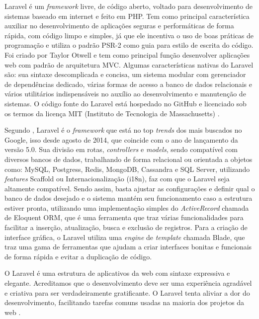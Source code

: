 Laravel é um \textit{framework} livre, de código aberto, voltado para desenvolvimento de sistemas baseado em internet e feito em PHP. Tem como principal característica auxiliar no desenvolvimento de aplicações seguras e performáticas de forma rápida, com código limpo e simples, já que ele incentiva o uso de boas práticas de programação e utiliza o padrão PSR-2 como guia para estilo de escrita do código. Foi criado por Taylor Otwell e tem como principal função desenvolver aplicações web com padrão de arquitetura MVC. Algumas características nativas do Laravel são: sua sintaxe descomplicada e concisa, um sistema modular com gerenciador de dependências dedicado, várias formas de acesso a banco de dados relacionais e vários utilitários indispensáveis no auxílio ao desenvolvimento e manutenção de sistemas. O código fonte do Laravel está hospedado no GitHub e licenciado sob os termos da licença MIT (Instituto de Tecnologia de Massachusetts) \cite{portalgsti:laravel}. 

Segundo , Laravel é o \textit{framework} que está no top \textit{trends} dos mais buscados no Google, isso desde agosto de 2014, que coincide com o ano de lançamento da versão 5.0. Sua divisão em rotas, \textit{controllers} e \textit{models}, sendo compatível com diversos bancos de dados, trabalhando de forma relacional ou orientada a objetos como: MySQL, Postgress, Redis, MongoDB, Cassandra e SQL Server, utilizando \textit{features} Scaffold ou Internacionalização (i18n), faz com que o Laravel seja altamente compatível. Sendo assim, basta ajustar as configurações e definir qual o banco de dados desejado e o sistema mantém seu funcionamento caso a estrutura estiver pronta, utilizando uma implementação simples do \textit{ActiveRecord} chamada de Eloquent ORM, que é uma ferramenta que traz várias funcionalidades para facilitar a inserção, atualização, busca e exclusão de registros. Para a criação de interface gráfica, o Laravel utiliza uma \textit{engine} de \textit{template} chamada Blade, que traz uma gama de ferramentas que ajudam a criar interfaces bonitas e funcionais de forma rápida e evitar a duplicação de código.

\begin{citacao}
 O Laravel é uma estrutura de aplicativos da web com sintaxe expressiva e elegante. Acreditamos que o desenvolvimento deve ser uma experiência agradável e criativa para ser verdadeiramente gratificante. O Laravel tenta aliviar a dor do desenvolvimento, facilitando tarefas comuns usadas na maioria dos projetos da web \cite{laravel}.
\end{citacao}

